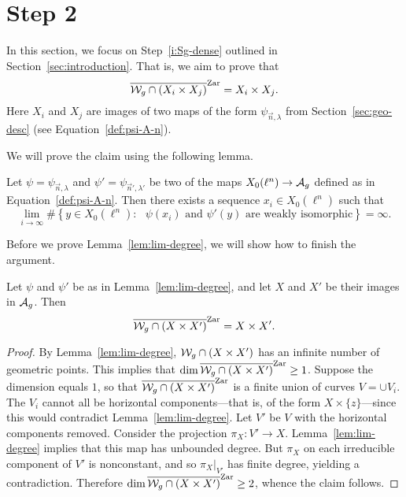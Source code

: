 \documentclass{amsart}
\begin{document}

\section{Step 2}
\label{sec:step-2}

In this section, we focus on Step~\ref{i:Sg-dense} outlined in Section~\ref{sec:introduction}. That is, we aim to prove that
\[
  \overline{\mathcal{W}_g \cap (X_i \times X_j)}^\mathrm{Zar} = X_i \times X_j.
\]
Here $X_i$ and $X_j$ are images of two maps of the form $\psi_{\vec{n},\lambda}$ from Section~\ref{sec:geo-desc} (see Equation~\ref{def:psi-A-n}).

We will prove the claim using the following lemma.

\begin{lemma}\label{lem:lim-degree}
  Let $\psi = \psi_{\vec{n},\lambda}$ and $\psi' = \psi_{\vec{n}',\lambda'}$ be two of the maps $X_0(\ell^n) \to \mathcal{A}_g$ defined as in Equation~\ref{def:psi-A-n}. Then there exists a sequence $x_i \in X_0(\ell^n)$ such that
  \[
    \lim_{i \to \infty}\#\left\{ y \in X_0(\ell^n) \colon \text{ $\psi(x_i)$ and $\psi'(y)$ are weakly isomorphic} \right\} = \infty.
  \]
\end{lemma}

Before we prove Lemma~\ref{lem:lim-degree}, we will show how to finish the argument.

\begin{corollary}
  Let $\psi$ and $\psi'$ be as in Lemma~\ref{lem:lim-degree}, and let $X$ and $X'$ be their images in $\mathcal{A}_g$. Then
  \[
    \overline{\mathcal{W}_g \cap (X \times X')}^\mathrm{Zar} = X \times X'.
  \]
\end{corollary}
\begin{proof}
  By Lemma~\ref{lem:lim-degree}, $\mathcal{W}_g \cap (X \times X')$ has an infinite number of geometric points. This implies that $\dim \overline{\mathcal{W}_g \cap (X \times X')}^\mathrm{Zar} \geq 1$. Suppose the dimension equals $1$, so that $\overline{\mathcal{W}_g \cap (X \times X')}^\mathrm{Zar}$ is a finite union of curves $V = \cup V_i$. The $V_i$ cannot all be horizontal components---that is, of the form $X \times \{z\}$---since this would contradict Lemma~\ref{lem:lim-degree}. Let $V'$ be $V$ with the horizontal components removed. Consider the projection $\pi_X: V' \to X$. Lemma~\ref{lem:lim-degree} implies that this map has unbounded degree. But $\pi_X$ on each irreducible component of $V'$ is nonconstant, and so $\pi_X|_{V'}$ has finite degree, yielding a contradiction. Therefore $\dim \overline{\mathcal{W}_g \cap (X \times X')}^\mathrm{Zar} \geq 2$, whence the claim follows.
\end{proof}
\end{document}
